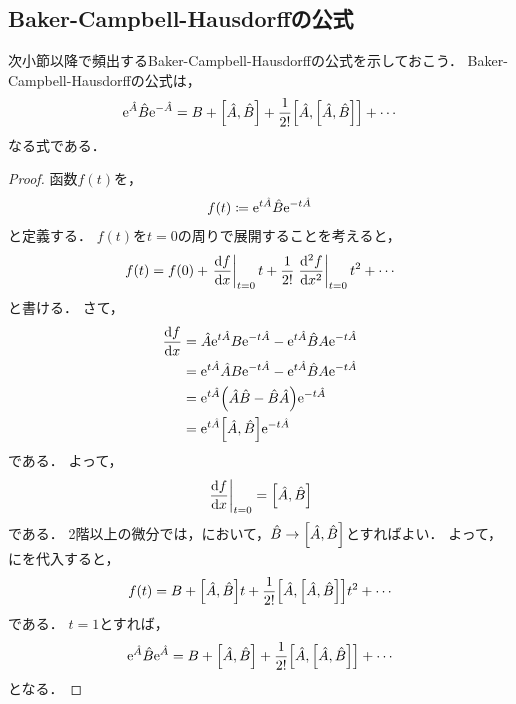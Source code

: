 \documentclass{report}
\begin{document}
  \subsection{Baker-Campbell-Hausdorffの公式}
    次小節以降で頻出するBaker-Campbell-Hausdorffの公式を示しておこう．
    Baker-Campbell-Hausdorffの公式は，
    \begin{align}
      \mathrm{e}^{\hat{A}}\hat{B}\mathrm{e}^{-\hat{A}} = B + \qty[\hat{A}, \hat{B}] + \frac{1}{2!}\qty[\hat{A}, \qty[\hat{A}, \hat{B}]] + \cdots
    \end{align}
    なる式である．
    \begin{proof}
      函数$f(t)$を，
      \begin{align}
        f(t) \coloneqq \mathrm{e}^{t\hat{A}}\hat{B}\mathrm{e}^{-t\hat{A}}
      \end{align}
      と定義する．
      $f(t)$を$t = 0$の周りで展開することを考えると，
      \begin{align}
        f(t) = f(0) + \eval{\dv{f}{x}}_{t = 0}t + \frac{1}{2!}\eval{\dv[2]{f}{x}}_{t = 0} t^2 + \cdots\label{taylor-bch}
      \end{align}
      と書ける．
      さて，
      \begin{align}
        \dv{f}{x} &= \hat{A}\mathrm{e}^{t\hat{A}}B\mathrm{e}^{-t\hat{A}} - \mathrm{e}^{t\hat{A}}\hat{B}A\mathrm{e}^{-t\hat{A}} \\ 
        &= \mathrm{e}^{t\hat{A}}\hat{A}B\mathrm{e}^{-t\hat{A}} - \mathrm{e}^{t\hat{A}}\hat{B}A\mathrm{e}^{-t\hat{A}} \\ 
        &= \mathrm{e}^{t\hat{A}}\qty(\hat{A}\hat{B} - \hat{B}\hat{A})\mathrm{e}^{-t\hat{A}} \\ 
        &= \mathrm{e}^{t\hat{A}}\qty[\hat{A}, \hat{B}]\mathrm{e}^{-t\hat{A}}\label{1st-diff-bch}
      \end{align}
      である．
      よって，
      \begin{align}
        \eval{\dv{f}{x}}_{t = 0} = \qty[\hat{A}, \hat{B}]
      \end{align}
      である．
      2階以上の微分では，において，$\hat{B} \to \qty[\hat{A}, \hat{B}]$とすればよい．
      よって，にを代入すると，
      \begin{align}
        f(t) = B + \qty[\hat{A}, \hat{B}]t + \frac{1}{2!}\qty[\hat{A}, \qty[\hat{A}, \hat{B}]]t^2 + \cdots
      \end{align}
      である．
      $t = 1$とすれば，
      \begin{align}
        \mathrm{e}^{\hat{A}}\hat{B}\mathrm{e}^{\hat{A}} = B + \qty[\hat{A}, \hat{B}] + \frac{1}{2!}\qty[\hat{A}, \qty[\hat{A}, \hat{B}]] + \cdots
      \end{align}
      となる．
    \end{proof}
\end{document}

